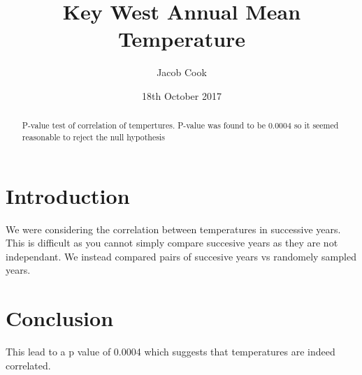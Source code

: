 \documentclass[12pt]{article}
\title{Key West Annual Mean Temperature}
\author{Jacob Cook}
\date{18th October 2017}
\begin{document}
\maketitle
\begin{abstract}
P-value test of correlation of tempertures. P-value was found to be $0.0004$ so it seemed reasonable to reject the null hypothesis
\end{abstract}
\section{Introduction}
We were considering the correlation between temperatures in successive years. This is difficult as you cannot simply compare succesive years as they are not independant.
We instead compared pairs of succesive years vs randomely sampled years.
\section{Conclusion}
This lead to a p value of 0.0004 which suggests that temperatures are indeed correlated.
\end{document}
